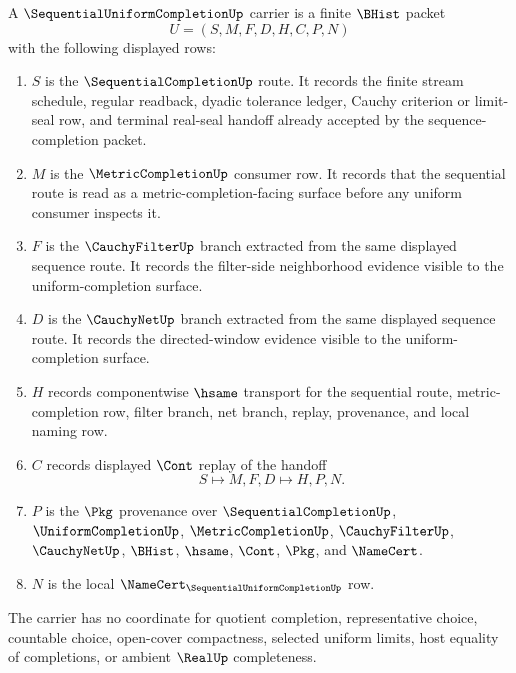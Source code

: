 \begin{definition}
\label{def:sequential-uniform-completion-carrier}
A $\SequentialUniformCompletionUp$ carrier is a finite $\BHist$ packet
$$
U=(S,M,F,D,H,C,P,N)
$$
with the following displayed rows:
\begin{enumerate}
\item $S$ is the $\SequentialCompletionUp$ route. It records the finite stream schedule, regular readback, dyadic tolerance ledger, Cauchy criterion or limit-seal row, and terminal real-seal handoff already accepted by the sequence-completion packet.
\item $M$ is the $\MetricCompletionUp$ consumer row. It records that the sequential route is read as a metric-completion-facing surface before any uniform consumer inspects it.
\item $F$ is the $\CauchyFilterUp$ branch extracted from the same displayed sequence route. It records the filter-side neighborhood evidence visible to the uniform-completion surface.
\item $D$ is the $\CauchyNetUp$ branch extracted from the same displayed sequence route. It records the directed-window evidence visible to the uniform-completion surface.
\item $H$ records componentwise $\hsame$ transport for the sequential route, metric-completion row, filter branch, net branch, replay, provenance, and local naming row.
\item $C$ records displayed $\Cont$ replay of the handoff
$$
S \longmapsto M,F,D \longmapsto H,P,N .
$$
\item $P$ is the $\Pkg$ provenance over $\SequentialCompletionUp$, $\UniformCompletionUp$, $\MetricCompletionUp$, $\CauchyFilterUp$, $\CauchyNetUp$, $\BHist$, $\hsame$, $\Cont$, $\Pkg$, and $\NameCert$.
\item $N$ is the local $\NameCert_{\SequentialUniformCompletionUp}$ row.
\end{enumerate}
The carrier has no coordinate for quotient completion, representative choice, countable choice, open-cover compactness, selected uniform limits, host equality of completions, or ambient $\RealUp$ completeness.
\end{definition}

